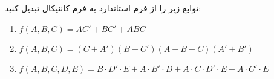 توابع زیر را از فرم استاندارد به فرم کاننیکال تبدیل کنید:

\begin{latin}
	\begin{enumerate}
		\item 
		$ f(A, B, C) = A C' + B C' + A B C $
		
		\item 
		$ f(A, B, C) = (C + A')(B + C')(A + B + C)(A' + B') $
		
		\item 
		$ f(A, B, C, D, E) = B \cdot D' \cdot E + A \cdot B' \cdot D + A \cdot C \cdot D' \cdot E + A \cdot C' \cdot E $
	\end{enumerate}
\end{latin}